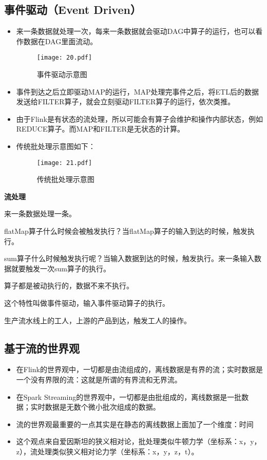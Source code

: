 \documentclass[cn,11pt,chinese]{elegantbook}
\begin{document}
\subsection{事件驱动（Event Driven）}

\begin{itemize}
  \item 来一条数据就处理一次，每来一条数据就会驱动DAG中算子的运行，也可以看作数据在DAG里面流动。
  \begin{figure}[htbp]
    \centering
    \texttt{[image: 20.pdf]}
    \caption{事件驱动示意图}
  \end{figure}
  \item 事件到达之后立即驱动MAP的运行，MAP处理完事件之后，将ETL后的数据发送给FILTER算子，就会立刻驱动FILTER算子的运行，依次类推。
  \item 由于Flink是有状态的流处理，所以可能会有算子会维护和操作内部状态，例如REDUCE算子。而MAP和FILTER是无状态的计算。
  \item 传统批处理示意图如下：
  \begin{figure}[htbp]
    \centering
    \texttt{[image: 21.pdf]}
    \caption{传统批处理示意图}
  \end{figure}
\end{itemize}

\begin{tcolorbox}
\textbf{流处理}

来一条数据处理一条。

flatMap算子什么时候会被触发执行？当flatMap算子的输入到达的时候，触发执行。

sum算子什么时候触发执行呢？当输入数据到达的时候，触发执行。来一条输入数据就要触发一次sum算子的执行。

算子都是被动执行的，数据不来不执行。

这个特性叫做事件驱动，输入事件驱动算子的执行。

生产流水线上的工人，上游的产品到达，触发工人的操作。
\end{tcolorbox}

\subsection{基于流的世界观}

\begin{itemize}
  \item 在Flink的世界观中，一切都是由流组成的，离线数据是有界的流；实时数据是一个没有界限的流：这就是所谓的有界流和无界流。
  \item 在Spark Streaming的世界观中，一切都是由批组成的，离线数据是一批数据；实时数据是无数个微小批次组成的数据。
  \item 流的世界观最重要的一点其实是在静态的离线数据上面加了一个维度：时间
  \item 这个观点来自爱因斯坦的狭义相对论，批处理类似牛顿力学（坐标系：x，y，z），流处理类似狭义相对论力学（坐标系：x，y，z，t）。
\end{itemize}
\end{document}
